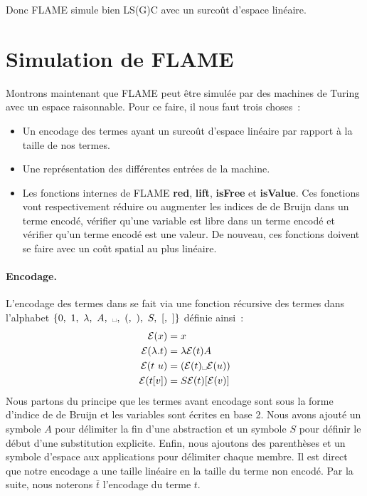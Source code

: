 \documentclass[a4paper, 11pt]{article}
\theoremstyle{definition}
\newcommand{\mce}{\mathcal{E}}
\begin{document}
Donc FLAME simule bien LS(G)C avec un surcoût d'espace linéaire.

\section{Simulation de FLAME}
\label{sim:flame}
Montrons maintenant que FLAME peut être simulée par des machines de Turing avec un espace raisonnable.
Pour ce faire, il nous faut trois choses~:
\begin{itemize}
    \item Un encodage des termes ayant un surcoût d'espace linéaire par rapport à la taille de nos termes.
    \item Une représentation des différentes entrées de la machine.
    \item Les fonctions internes de FLAME \textbf{red}, \textbf{lift}, \textbf{isFree} et \textbf{isValue}. Ces fonctions vont respectivement réduire ou augmenter les indices de de Bruijn dans un terme encodé, vérifier qu'une variable est libre dans un terme encodé et vérifier qu'un terme encodé est une valeur.
    De nouveau, ces fonctions doivent se faire avec un coût spatial au plus linéaire.
\end{itemize}

\paragraph{Encodage.} L'encodage des termes dans se fait via une fonction récursive des termes dans l'alphabet $\{0,~1,~\lambda,~A,~\text{\textvisiblespace},~(,~),~S,~[,~]\}$ définie ainsi~:
\label{enc}
\begin{align*}
    \mce(x) &=x\\
    \mce(\lambda .t) &=\lambda \mce(t) A\\
    \mce(t~u)&=(\mce(t)\text{\textvisiblespace}\mce(u))\\
    \mce(t[v])&=S\mce(t)[\mce(v)]
\end{align*}
Nous partons du principe que les termes avant encodage sont sous la forme d'indice de de Bruijn et les variables sont écrites en base 2. 
Nous avons ajouté un symbole $A$ pour délimiter la fin d'une abstraction et un symbole $S$ pour définir le début d'une substitution explicite. 
Enfin, nous ajoutons des parenthèses et un symbole d'espace aux applications pour délimiter chaque membre.
Il est direct que notre encodage a une taille linéaire en la taille du terme non encodé.
Par la suite, nous noterons $\bar{t}$ l'encodage du terme $t$.
\end{document}
